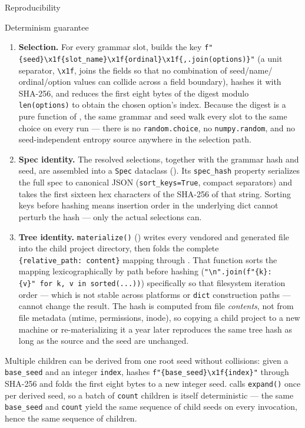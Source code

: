 \documentclass[
  ignorenonframetext,
]{beamer}
\providecommand{\tightlist}{%
  \setlength{\itemsep}{0pt}\setlength{\parskip}{0pt}}
\begin{document}
\begin{frame}{Reproducibility}
\begin{block}{Determinism guarantee}
\begin{enumerate}
\tightlist
\item
  \textbf{Selection.} For every grammar slot,
   builds the key
  \texttt{f"\{seed\}\textbackslash{}x1f\{slot\_name\}\textbackslash{}x1f\{ordinal\}\textbackslash{}x1f\{\textquotesingle{},\textquotesingle{}.join(options)\}"}
  (a unit separator, \texttt{\textbackslash{}x1f}, joins the fields so
  that no combination of seed/name/ ordinal/option values can collide
  across a field boundary), hashes it with SHA-256, and reduces the
  first eight bytes of the digest modulo \texttt{len(options)} to obtain
  the chosen option's index. Because the digest is a pure function of
  , the same grammar and
  seed walk every slot to the same choice on every run --- there is no
  \texttt{random.choice}, no \texttt{numpy.random}, and no
  seed-independent entropy source anywhere in the selection path.
\item
  \textbf{Spec identity.} The resolved selections, together with the
  grammar hash and seed, are assembled into a \texttt{Spec} dataclass
  (). Its \texttt{spec\_hash} property
  serializes the full spec to canonical JSON (\texttt{sort\_keys=True},
  compact separators) and takes the first sixteen hex characters of the
  SHA-256 of that string. Sorting keys before hashing means insertion
  order in the underlying dict cannot perturb the hash --- only the
  actual selections can.
\item
  \textbf{Tree identity.} \texttt{materialize()}
  () writes every vendored and generated file
  into the child project directory, then folds the complete
  \texttt{\{relative\_path:\ content\}} mapping through
  . That
  function sorts the mapping lexicographically by path before hashing
  (\texttt{"\textbackslash{}n".join(f"\{k\}:\{v\}"\ for\ k,\ v\ in\ sorted(...))})
  specifically so that filesystem iteration order --- which is not
  stable across platforms or \texttt{dict} construction paths --- cannot
  change the result. The hash is computed from file \emph{contents}, not
  from file metadata (mtime, permissions, inode), so copying a child
  project to a new machine or re-materializing it a year later
  reproduces the same tree hash as long as the source and the seed are
  unchanged.
\end{enumerate}

Multiple children can be derived from one root seed without collisions:
given a \texttt{base\_seed} and an integer \texttt{index},
 hashes
\texttt{f"\{base\_seed\}\textbackslash{}x1f\{index\}"} through SHA-256
and folds the first eight bytes to a new integer seed.
 calls \texttt{expand()} once per
derived seed, so a batch of \texttt{count} children is itself
deterministic --- the same \texttt{base\_seed} and \texttt{count} yield
the same sequence of child seeds on every invocation, hence the same
sequence of children.
\end{block}


\end{frame}
\end{document}
